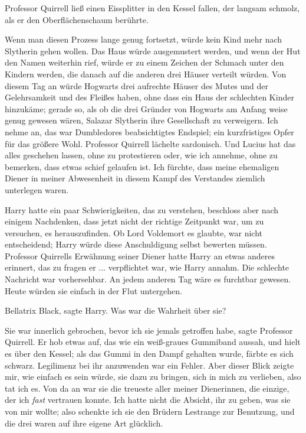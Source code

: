 Professor Quirrell ließ einen Eissplitter in den Kessel fallen, der langsam
schmolz, als er den Oberflächenschaum berührte.

\glqq{}Wenn man diesen Prozess lange genug fortsetzt, würde kein Kind mehr nach
Slytherin gehen wollen. Das Haus würde ausgemustert werden, und wenn der Hut den
Namen weiterhin rief, würde er zu einem Zeichen der Schmach unter den Kindern
werden, die danach auf die anderen drei Häuser verteilt würden. Von diesem Tag
an würde Hogwarts drei aufrechte Häuser des Mutes und der Gelehrsamkeit und des
Fleißes haben, ohne dass ein Haus der schlechten Kinder hinzukäme; gerade so,
als ob die drei Gründer von Hogwarts am Anfang weise genug gewesen wären,
Salazar Slytherin ihre Gesellschaft zu verweigern. Ich nehme an, das war
Dumbledores beabsichtigtes Endspiel; ein kurzfristiges Opfer für das größere
Wohl.\grqq{} Professor Quirrell lächelte sardonisch. \glqq{}Und Lucius hat das alles
geschehen lassen, ohne zu protestieren oder, wie ich annehme, ohne zu bemerken,
dass etwas schief gelaufen ist. Ich fürchte, dass meine ehemaligen Diener in
meiner Abwesenheit in diesem Kampf des Verstandes ziemlich unterlegen waren.\grqq{}

Harry hatte ein paar Schwierigkeiten, das zu verstehen, beschloss aber nach
einigem Nachdenken, dass jetzt nicht der richtige Zeitpunkt war, um zu
versuchen, es herauszufinden. Ob Lord Voldemort es glaubte, war nicht
entscheidend; Harry würde diese Anschuldigung selbst bewerten müssen. Professor
Quirrells Erwähnung seiner Diener hatte Harry an etwas anderes erinnert, das zu
fragen er ... verpflichtet war, wie Harry annahm. Die schlechte Nachricht war
vorhersehbar. An jedem anderen Tag wäre es furchtbar gewesen. Heute würden sie
einfach in der Flut untergehen.

\glqq{}Bellatrix Black\grqq{}, sagte Harry. \glqq{}Was war die Wahrheit über sie?\grqq{}

\glqq{}Sie war innerlich gebrochen, bevor ich sie jemals getroffen habe\grqq{},
sagte Professor Quirrell. Er hob etwas auf, das wie ein weiß-graues Gummiband
aussah, und hielt es über den Kessel; als das Gummi in den Dampf gehalten wurde,
färbte es sich schwarz. \glqq{}Legilimenz bei ihr anzuwenden war ein Fehler. Aber
dieser Blick zeigte mir, wie einfach es sein würde, sie dazu zu bringen, sich in
mich zu verlieben, also tat ich es. Von da an war sie die treueste aller meiner
Dienerinnen, die einzige, der ich \emph{fast} vertrauen konnte. Ich hatte nicht
die Absicht, ihr zu geben, was sie von mir wollte; also schenkte ich sie den
Brüdern Lestrange zur Benutzung, und die drei waren auf ihre eigene Art
glücklich.\grqq{}

